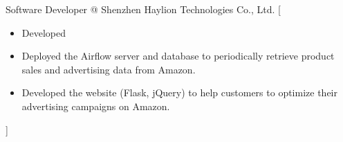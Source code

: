\documentclass{resume}
\begin{document}
\begin{experiences}
    {Software Developer @ Shenzhen Haylion Technologies Co., Ltd.}%
    [\begin{itemize}
      \item Developed 
      \item Deployed the Airflow server and database to periodically
        retrieve product sales and advertising data from Amazon.
      \item Developed the website (Flask, jQuery) to help customers to
        optimize their advertising campaigns on Amazon.
    \end{itemize}]

\end{experiences}

\begin{competences}[10em]
\end{competences}
\end{document}
